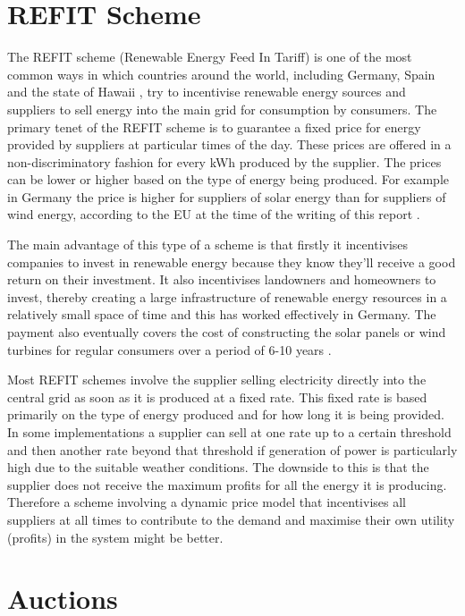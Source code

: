 \documentclass[a4paper, notitlepage]{report}
\begin{document}
\chapter{REFIT Scheme}
\label{sec:orgd495e68}
The REFIT scheme (Renewable Energy Feed In Tariff) is one of the most common
ways in which countries around the world, including Germany, Spain and the state
of Hawaii \cite{couture2010analysis}, try to incentivise renewable energy sources
and suppliers to sell energy into the main grid for consumption by consumers.
The primary tenet of the REFIT scheme is to guarantee a fixed price for energy
provided by suppliers at particular times of the day. These prices are offered
in a non-discriminatory fashion for every kWh produced by the supplier. The
prices can be lower or higher based on the type of energy being produced. For
example in Germany the price is higher for suppliers of solar energy than for
suppliers of wind energy, according to the EU at the time of the writing of this
report \cite{refit_germany}.

The main advantage of this type of a scheme is that firstly it incentivises
companies to invest in renewable energy because they know they’ll receive a good
return on their investment. It also incentivises landowners and homeowners to
invest, thereby creating a large infrastructure of renewable energy resources in
a relatively small space of time and this has worked effectively in Germany. The
payment also eventually covers the cost of constructing the solar panels or wind
turbines for regular consumers over a period of 6-10 years \cite{lauber2004refit}. 

Most REFIT schemes involve the supplier selling electricity directly into the
central grid as soon as it is produced at a fixed rate. This fixed rate is based
primarily on the type of energy produced and for how long it is being provided.
In some implementations a supplier can sell at one rate up to a certain
threshold and then another rate beyond that threshold if generation of power is
particularly high due to the suitable weather conditions. The downside to this
is that the supplier does not receive the maximum profits for all the energy it
is producing. Therefore a scheme involving a dynamic price model that incentivises
all suppliers at all times to contribute to the demand and maximise their own
utility (profits) in the system might be better.
\chapter{Auctions}
\label{sec:orgb16d43a}
\end{document}
